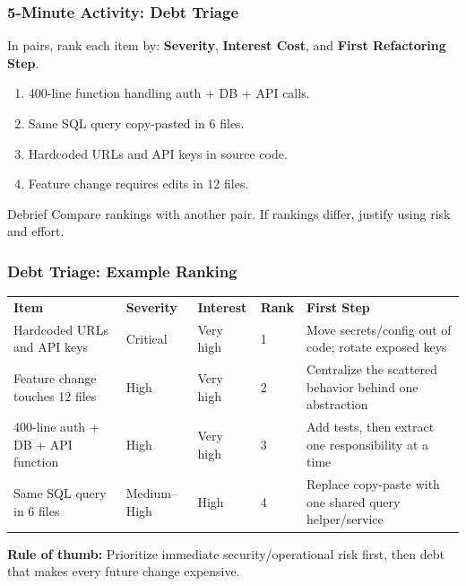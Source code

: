 \documentclass[xcolor=table]{beamer}
\begin{document}
\begin{frame}[fragile]
    \frametitle{5-Minute Activity: Debt Triage}
    \small
    In pairs, rank each item by: \textbf{Severity}, \textbf{Interest Cost}, and \textbf{First Refactoring Step}.

    \vspace{0.2cm}
    \begin{enumerate}
        \item 400-line function handling auth + DB + API calls.
        \item Same SQL query copy-pasted in 6 files.
        \item Hardcoded URLs and API keys in source code.
        \item Feature change requires edits in 12 files.
    \end{enumerate}

    \pause
    \vspace{0.2cm}
    \begin{alertblock}{Debrief}
        Compare rankings with another pair. If rankings differ, justify using risk and effort.
    \end{alertblock}
\end{frame}

\begin{frame}
    \frametitle{Debt Triage: Example Ranking}
    \scriptsize
    \centering
    \begin{tabular}{p{} p{} p{} p{} p{}}
        \rowcolor{blue!20}
        \textbf{Item} & \textbf{Severity} & \textbf{Interest} & \textbf{Rank} & \textbf{First Step} \\
        Hardcoded URLs and API keys & Critical & Very high & 1 & Move secrets/config out of code; rotate exposed keys \\
        Feature change touches 12 files & High & Very high & 2 & Centralize the scattered behavior behind one abstraction \\
        400-line auth + DB + API function & High & Very high & 3 & Add tests, then extract one responsibility at a time \\
        Same SQL query in 6 files & Medium--High & High & 4 & Replace copy-paste with one shared query helper/service \\
    \end{tabular}

    \vspace{0.2cm}
    \textbf{Rule of thumb:} Prioritize immediate security/operational risk first, then debt that makes every future change expensive.
\end{frame}
\end{document}
